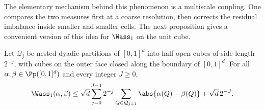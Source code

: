 The elementary mechanism behind this phenomenon is a multiscale coupling. One compares the two measures first at a coarse resolution, then corrects the residual imbalance inside smaller and smaller cells. The next proposition gives a convenient version of this idea for \(\Wass_1\) on the unit cube.

\begin{prop}\label{prop-dyadic-partition-w1}
	Let \(\mathcal Q_j\) be nested dyadic partitions of \([0,1]^d\) into half-open cubes of side length \(2^{-j}\), with cubes on the outer face closed along the boundary of \([0,1]^d\). For all \(\alpha,\beta\in\Pp([0,1]^d)\) and every integer \(J\geq0\),
	\[
		\Wass_1(\alpha,\beta)
		\leq
		\sqrt d
		\sum_{j=0}^{J-1}2^{-j}
		\sum_{Q\in\mathcal Q_{j+1}}\abs{\alpha(Q)-\beta(Q)}
		+
		\sqrt d\,2^{-J}.
	\]
\end{prop}


